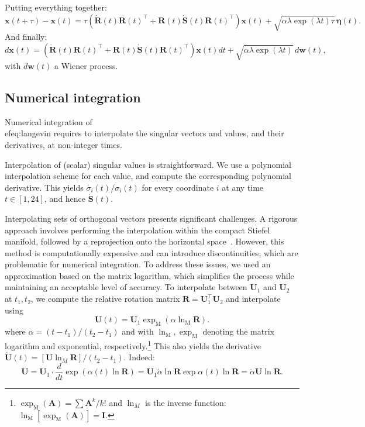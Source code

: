 \documentclass{article} %
\def\vw{{\bm{w}}}
\def\vx{{\bm{x}}}
\def\mA{{\bm{A}}}
\def\mI{{\bm{I}}}
\def\mR{{\bm{R}}}
\def\mS{{\bm{S}}}
\def\mU{{\bm{U}}}
\begin{document}
Putting everything together:
\begin{equation*}
    \vx (t + \tau) - \vx (t) = \tau \left( \dot{\mR}(t) \mR(t)^{\top} + \mR(t) \dot{\mS}(t) \mR(t)^{\top} \right) \vx (t) + \sqrt{\alpha \lambda \exp(\lambda t) \tau} \, \mathbf{\eta} (t).
\end{equation*}
And finally:
\begin{equation*}
    d\vx (t) = \left( \dot{\mR}(t) \mR(t)^{\top} + \mR(t) \dot{\mS}(t) \mR(t)^{\top} \right) \vx(t) dt + \sqrt{\alpha \lambda \exp(\lambda t)} \, d\vw(t),
\end{equation*}
with $d\vw(t)$ a Wiener process.

\subsection{Numerical integration}
\label{app:simulations}

Numerical integration of~\\ef{eq:langevin} requires to interpolate the singular vectors and values, and their derivatives, at non-integer times.

Interpolation of (scalar) singular values is straightforward. 
We use a polynomial interpolation scheme for each value, and compute the corresponding polynomial derivative.
This yields $\dot{\sigma_i}(t)/\sigma_i(t)$ for every coordinate $i$ at any time $t \in [1, 24]$, and hence $\dot{\mS}(t)$.

Interpolating sets of orthogonal vectors presents significant challenges. A rigorous approach involves performing the interpolation within the compact Stiefel manifold, followed by a reprojection onto the horizontal space~\cite{PRAVEEN2023115971}. However, this method is computationally expensive and can introduce discontinuities, which are problematic for numerical integration. To address these issues, we used an approximation based on the matrix logarithm, which simplifies the process while maintaining an acceptable level of accuracy. 
To interpolate between $\mU_1$ and $\mU_2$ at $t_1, t_2$, we compute the relative rotation matrix $\mR = \mU_1^{\top} \mU_2$ and interpolate using
\begin{equation}
    \mU(t) = \mU_1 \exp_\mathrm{M}(\alpha \ln_\mathrm{M}{\mR}).
\end{equation}
where $\alpha = (t-t_1)/(t_2-t_1)$ and with $\ln_\mathrm{M}, \exp_\mathrm{M}$ denoting the matrix logarithm and exponential, respectively.\footnote{
$\exp_\mathrm{M} (\mA) = \sum \mA^k/k!$ and $\ln_M$ is the inverse function: $\ln_\mathrm{M} \left[ \exp_\mathrm{M} (\mA)\right] = \mI$.
}
This also yields the derivative $\dot{\mU}(t) = \left[ \mU \ln_M{\mR} \right] /(t_2 - t_1)$.
Indeed:
\begin{equation*}
    \dot{\mU} = \mU_1 \cdot \frac{d}{dt} \exp \left( \alpha(t) \ln{\mR} \right)
    = \mU_1 \dot{\alpha} \ln{\mR} \exp{\alpha(t) \ln{\mR}}
    = \dot{\alpha} \mU \ln{\mR}.
\end{equation*}
\end{document}
